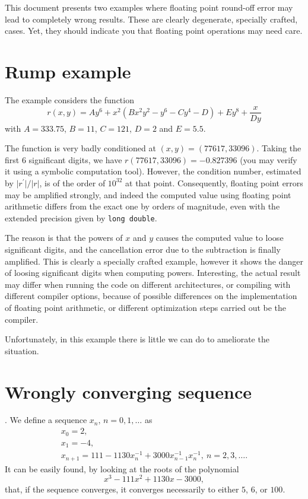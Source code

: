 \documentclass{article}
\begin{document}
This document presents two examples where floating point round-off error may lead to completely wrong results. These are clearly degenerate, specially crafted,  cases. Yet, they should indicate you that floating point operations may need care.

\section{Rump example}
The example considers the function
\[
  r(x,y)=Ay^6+x^2(Bx^2y^2-y^6-Cy^4-D)+Ey^8+\frac{x}{Dy}
\]
 with
  $A=333.75$, $B=11$, $C=121$, $D=2$ and $E=5.5$.
  
  The function is very badly conditioned at $(x,y)=(77617,33096)$.
  Taking the first $6$ significant digits, we have
  $r(77617,33096)=-0.827396$ (you may verify it using a symbolic
  computation tool). However, the condition number, estimated by
  $\vert r^\prime\vert/\vert r\vert$, is of the order of $10^{32}$ at
  that point. Consequently, floating point errors may be amplified
  strongly, and indeed the computed value using floating point
  arithmetic differs from the exact one by orders of magnitude, even
  with the extended precision given by \texttt{long double}.

  The reason is that the powers of $x$ and $y$ causes the computed
  value to loose significant digits, and the cancellation error due to
  the subtraction is finally amplified. This is clearly a specially
  crafted example, however it shows the danger of loosing significant
  digits when computing powers. Interesting, the actual result may
  differ when running the code on different architectures, or
  compiling with different compiler options, because of possible differences
  on the implementation of floating point arithmetic, or different
  optimization steps carried out be the compiler.

  Unfortunately, in this example there is little we can do to
  ameliorate the situation. 
  
\section{Wrongly converging sequence}.
We define a sequence $x_n,\, n=0,1,\ldots$ as
\[
  \begin{array}{l}
    x_0=2,\\
    x_1=-4,\\
    x_{n+1}=111-1130x_n^{-1}+3000x^{-1}_{n-1}x^{-1}_{n},\ n=2,3,\ldots.
  \end{array}
\]
    It can be easily found, by looking at the roots of the polynomial
    \[
    x^3-111x^2+1130x-3000,
    \]
    that, if the sequence converges, it converges necessarily to either
    $5$, $6$, or $100$.
    
\end{document}
